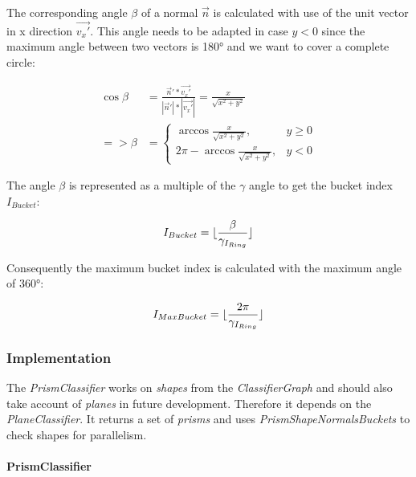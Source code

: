 \documentclass[../ClassicThesis.tex]{subfiles}
\begin{document}
The corresponding angle $ \beta $ of a normal $ \vec{n} $ is calculated with use of the unit vector in x direction $ \vec{v_{x}'} $. This angle needs to be adapted in case $ y < 0 $ since the maximum angle between two vectors is 180° and we want to cover a complete circle:

\begin{equation}
\begin{split}
    \cos{\beta} & = \frac{\vec{n}' * \vec{v_{x}'}}{|\vec{n}'| * |\vec{v_{x}'}|} = \frac{x}{\sqrt{x^{2} + y^{2}}} \\
    => \beta & = \begin{cases}
        \arccos{ \frac{x}{\sqrt{x^{2} + y^{2}}} }, & y \geq 0 \\
        2 \pi - \arccos{ \frac{x}{\sqrt{x^{2} + y^{2}}} }, & y < 0
    \end{cases}
\end{split}
\end{equation}

The angle $ \beta $ is represented as a multiple of the $ \gamma $ angle to get the bucket index $ I_{Bucket} $:

\begin{equation}
    I_{Bucket} = \lfloor\frac{\beta}{ {\gamma}_{I_{Ring}} }\rfloor
\end{equation}

Consequently the maximum bucket index is calculated with the maximum angle of 360°:

\begin{equation}
    I_{MaxBucket} = \lfloor\frac{2 \pi}{ {\gamma}_{I_{Ring}} }\rfloor
\end{equation}



\subsubsection{Implementation}


The \emph{PrismClassifier} works on \emph{shapes} from the \emph{ClassifierGraph} and should also take account of \emph{planes} in future development. Therefore it depends on the \emph{PlaneClassifier}. It returns a set of \emph{prisms} and uses \emph{PrismShapeNormalsBuckets} to check shapes for parallelism.

\paragraph{PrismClassifier}
\end{document}
